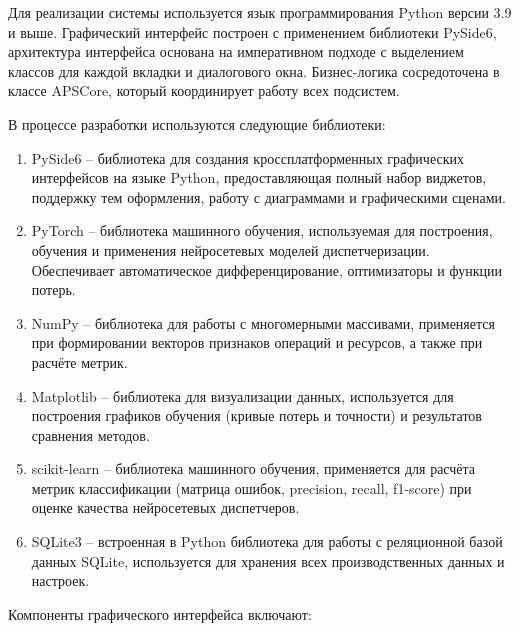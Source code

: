 Для реализации системы используется язык программирования Python версии 3.9 и выше. Графический интерфейс построен с применением библиотеки PySide6, архитектура интерфейса основана на императивном подходе с выделением классов для каждой вкладки и диалогового окна. Бизнес-логика сосредоточена в классе APSCore, который координирует работу всех подсистем.

В процессе разработки используются следующие библиотеки:

\begin{enumerate}
\item PySide6 – библиотека для создания кроссплатформенных графических интерфейсов на языке Python, предоставляющая полный набор виджетов, поддержку тем оформления, работу с диаграммами и графическими сценами.
\item PyTorch – библиотека машинного обучения, используемая для построения, обучения и применения нейросетевых моделей диспетчеризации. Обеспечивает автоматическое дифференцирование, оптимизаторы и функции потерь.
\item NumPy – библиотека для работы с многомерными массивами, применяется при формировании векторов признаков операций и ресурсов, а также при расчёте метрик.
\item Matplotlib – библиотека для визуализации данных, используется для построения графиков обучения (кривые потерь и точности) и результатов сравнения методов.
\item scikit-learn – библиотека машинного обучения, применяется для расчёта метрик классификации (матрица ошибок, precision, recall, f1-score) при оценке качества нейросетевых диспетчеров.
\item SQLite3 – встроенная в Python библиотека для работы с реляционной базой данных SQLite, используется для хранения всех производственных данных и настроек.
\end{enumerate}

Компоненты графического интерфейса включают:

